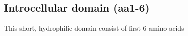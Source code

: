 \subsection{Introcellular domain (aa1-6)}

This short, hydrophilic domain consist of first 6 amino acids 